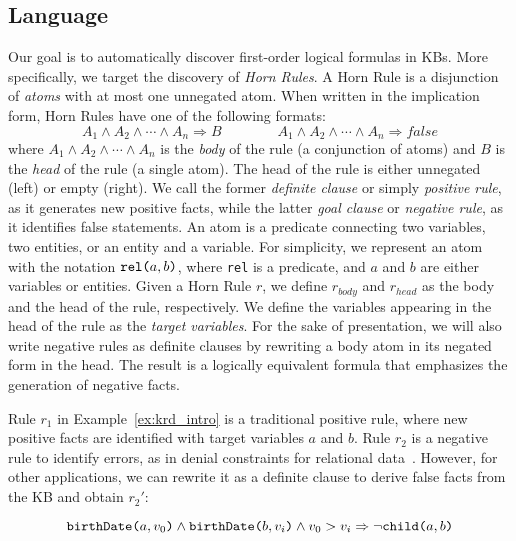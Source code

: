 \subsection{Language} \label{sec:krd_language} 
Our goal is to automatically discover first-order logical formulas in KBs. More specifically, we target the discovery of \emph{Horn Rules}. A Horn Rule is a disjunction of \emph{atoms} with at most one unnegated atom. When written in the implication form, Horn Rules have one of the following formats:
%
\begin{equation*}
	A_1 \wedge A_2 \wedge \cdots \wedge A_n \Rightarrow B \qquad \qquad A_1 \wedge A_2 \wedge \cdots \wedge A_n \Rightarrow  false 
\end{equation*} %
%
where $A_1 \wedge A_2 \wedge \cdots \wedge A_n$ is the \emph{body} of the rule (a conjunction of atoms) and $B$ is the \emph{head} of the rule (a single atom). The head of the rule is either unnegated (left) or empty (right). We call the former \emph{definite clause} or simply \emph{positive rule}, as it generates new positive facts, while the latter \emph{goal clause} or \emph{negative rule}, as it identifies false statements. %
An atom is a predicate connecting two variables, two entities, or an entity and a variable. For simplicity, we represent an atom with the notation $\texttt{rel(}a,b\texttt{)}$, where \texttt{rel} is a predicate, and $a$ and $b$ are either variables or entities. 
Given a Horn Rule $r$, we define $r_{body}$ and $r_{head}$ as the body and the head of the rule, respectively. We define the variables appearing in the head of the rule as the \emph{target variables}. 
For the sake of presentation, we will also write negative rules as definite clauses by rewriting a body atom in its negated form in the head. The result is a logically equivalent formula that emphasizes the generation of negative facts.

\begin{example}\label{ex:ex2}
	Rule $r_1$ in Example~\ref{ex:krd_intro} is a traditional positive rule, where new positive facts are identified with target variables $a$ and $b$.
	Rule $r_2$ is a negative rule to identify errors, as in denial constraints for relational data~\cite{chu2013discovering}. However, for other applications, we can rewrite it as a definite clause to derive false facts from the KB and obtain $r_2'$:
	
	\vspace{-3.5ex}
	{\small	
		\begin{equation*}
			\texttt{birthDate(}a,v_0\texttt{)} \wedge \texttt{birthDate(}b,v_i\texttt{)} \wedge v_0 > v_i
			\Rightarrow  \neg \texttt{child(}a,b\texttt{)}  
		\end{equation*}
	}
	\vspace{-2.5ex}
\end{example} 


